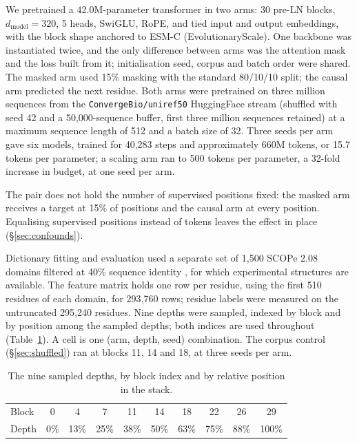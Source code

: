 \documentclass{article} %
\newcommand{\red}[1]{\textcolor{red}{#1}}
\newcommand{\opentag}[1]{\textcolor{red}{\textsuperscript{[\ref{#1}]}}}
\newcommand{\pend}[2]{\red{#1}\opentag{#2}}
\renewcommand{\red}[1]{#1}
\renewcommand{\opentag}[1]{}
\renewcommand{\pend}[2]{#1}
\begin{document}
We pretrained a 42.0M-parameter transformer in two arms: 30 pre-LN blocks, $d_{\mathrm{model}} =
320$, 5 heads, SwiGLU, RoPE, and tied input and output embeddings, with the block shape anchored
to ESM-C (EvolutionaryScale). One backbone was instantiated twice, and the only difference
between arms was the attention mask and the loss built from it; initialisation seed, corpus and
batch order were shared. The masked arm used 15\% masking with the standard 80/10/10 split; the
causal arm predicted the next residue. Both arms were pretrained on three million sequences from
the \texttt{ConvergeBio/uniref50} HuggingFace
stream (shuffled with seed 42 and a 50{,}000-sequence buffer, first three million sequences
retained)\opentag{f:uniref} at a maximum sequence length of 512 and a batch
size of 32. Three seeds per arm gave six models, trained for 40{,}283 steps and approximately
660M tokens, or 15.7 tokens per parameter; a scaling arm ran to 500 tokens per parameter, a
32-fold increase in budget, \pend{at one seed per arm}{t:scaleseeds}.

The pair does not hold the number of supervised positions fixed: the masked arm receives a target
at 15\% of positions and the causal arm at every position. Equalising supervised positions instead
of tokens leaves the effect in place (\S\ref{sec:confounds}).

Dictionary fitting and evaluation used a separate set of 1{,}500 SCOPe 2.08 domains filtered at
40\% sequence identity \citep{chandonia2022scope}, for which experimental structures are
available. The feature matrix holds one row per residue, using the first 510 residues of each
domain, for 293{,}760 rows; residue labels were measured on the untruncated 295{,}240 residues.
Nine depths were sampled, indexed by block and by position among the sampled depths; both indices
are used throughout (Table~\ref{tab:depths}). A cell is one (arm, depth, seed) combination. The
corpus control (\S\ref{sec:shuffled}) ran at blocks 11, 14 and 18, at three seeds per arm.

\begin{table}[t]
\caption{The nine sampled depths, by block index and by relative position in the stack.}
\label{tab:depths}
\begin{center}
\begin{tabular}{lccccccccc}
\toprule
Block & 0 & 4 & 7 & 11 & 14 & 18 & 22 & 26 & 29 \\
Depth & 0\% & 13\% & 25\% & 38\% & 50\% & 63\% & 75\% & 88\% & 100\% \\
\bottomrule
\end{tabular}
\end{center}
\end{table}
\end{document}
